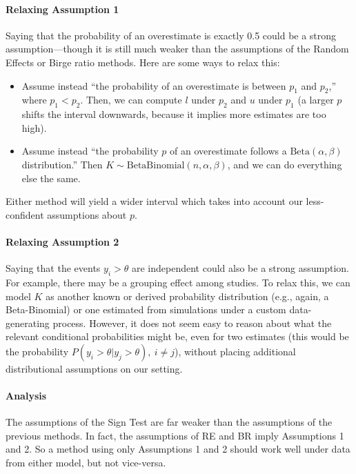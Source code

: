 \documentclass[12pt]{article}
\begin{document}
\paragraph{Relaxing Assumption 1}\label{relaxing-assumption-1}

Saying that the probability of an overestimate is exactly 0.5 could be a strong assumption---though it is still much weaker than the assumptions of the Random Effects or Birge ratio methods. Here are some ways to relax this:

\begin{itemize}
\item
  Assume instead ``the probability of an overestimate is between $p_1$ and $p_2$,'' where $p_1<p_2$. Then, we can compute $l$ under $p_2$ and $u$ under $p_1$ (a larger $p$ shifts the interval downwards, because it implies more estimates are too high).
\item
  Assume instead ``the probability $p$ of an overestimate follows a $\mathrm{Beta}(\alpha,\beta)$ distribution.'' Then $K\sim\mathrm{BetaBinomial}(n,\alpha,\beta)$, and we can do everything else the same.
\end{itemize}

Either method will yield a wider interval which takes into account our less-confident assumptions about $p$.

\paragraph{Relaxing Assumption 2}\label{relaxing-assumption-2}

Saying that the events $y_i>\theta$ are independent could also be a strong assumption. For example, there may be a grouping effect among studies. To relax this, we can model $K$ as another known or derived probability distribution (e.g., again, a Beta-Binomial) or one estimated from simulations under a custom data-generating process. However, it does not seem easy to reason about what the relevant conditional probabilities might be, even for two estimates (this would be the probability $P(y_i>\theta|y_j>\theta),\ i\neq j$), without placing additional distributional assumptions on our setting.

\paragraph{Analysis}\label{analysis}

The assumptions of the Sign Test are far weaker than the assumptions of the previous methods. In fact, the assumptions of RE and BR imply Assumptions 1 and 2. So a method using only Assumptions 1 and 2 should work well under data from either model, but not vice-versa.
\end{document}

